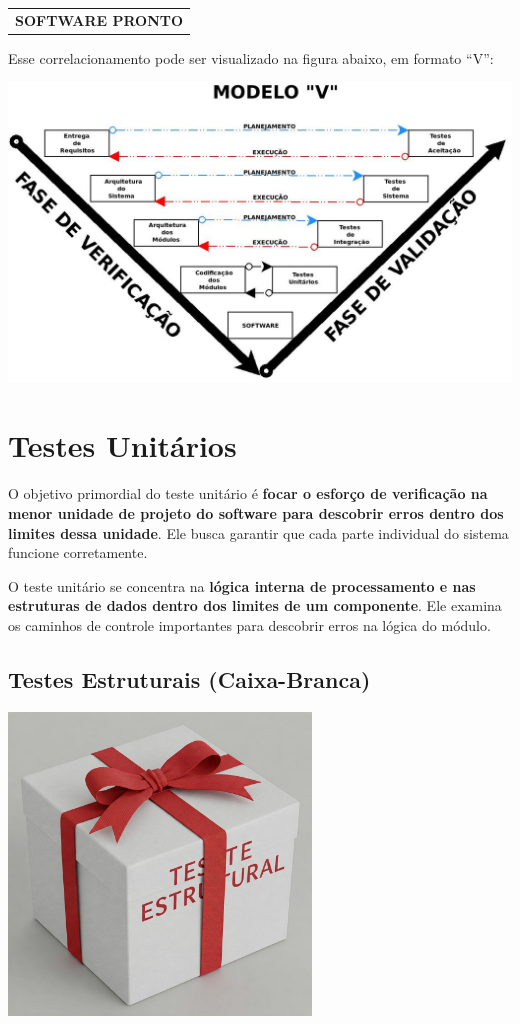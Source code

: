 \documentclass[
]{book}
\begin{document}
\begin{longtable}[]{@{}c@{}}
\toprule\noalign{}
\endhead
\bottomrule\noalign{}
\endlastfoot
\textbf{SOFTWARE PRONTO} \\
\end{longtable}

Esse correlacionamento pode ser visualizado na figura abaixo, em formato ``V'':

\includegraphics[width=8.33333in,height=\textheight]{images/VerificacaoValidacao/Modelo-V.jpg}

\section{Testes Unitários}\label{testes-unituxe1rios}

O objetivo primordial do teste unitário é \textbf{focar o esforço de verificação na menor unidade de projeto do software para descobrir erros dentro dos limites dessa unidade}. Ele busca garantir que cada parte individual do sistema funcione corretamente.

O teste unitário se concentra na \textbf{lógica interna de processamento e nas estruturas de dados dentro dos limites de um componente}. Ele examina os caminhos de controle importantes para descobrir erros na lógica do módulo.

\subsection{Testes Estruturais (Caixa-Branca)}\label{testes-estruturais-caixa-branca}

\includegraphics[width=3.16667in,height=\textheight]{images/VerificacaoValidacao/TestesSoftware/caixa_branca.jpeg}
\end{document}
